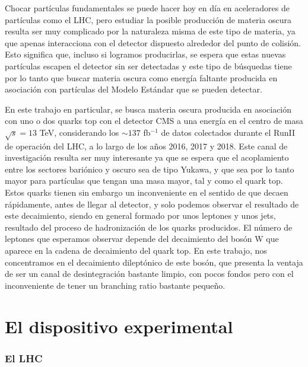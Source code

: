 \documentclass[a4paper, 10pt, openright]{report}
\begin{document}
\begin{appendices}
Chocar part\'{i}culas fundamentales se puede hacer hoy en d\'{i}a en aceleradores de part\'{i}culas como el \ac{LHC}, pero estudiar la posible producci\'{o}n de materia oscura resulta ser muy complicado por la naturaleza misma de este tipo de materia, ya que apenas interacciona con el detector dispuesto alrededor del punto de colisi\'{o}n. Esto significa que, incluso si logramos producirlas, se espera que estas nuevas part\'{i}culas escapen el detector sin ser detectadas y este tipo de b\'{u}squedas tiene por lo tanto que buscar materia oscura como energ\'{i}a faltante producida en asociaci\'{o}n con part\'{i}culas del Modelo Est\'{a}ndar que se pueden detectar. 

En este trabajo en particular, se busca materia oscura producida en asociaci\'{o}n con uno o dos quarks top con el detector \ac{CMS} a una energ\'{i}a en el centro de masa $\sqrt{s} = 13$ TeV, considerando los $\sim 137$ fb$^{-1}$ de datos colectados durante el RunII de operaci\'{o}n del \ac{LHC}, a lo largo de los a\~{n}os 2016, 2017 y 2018. Este canal de investigaci\'{o}n resulta ser muy interesante ya que se espera que el acoplamiento entre los sectores bari\'{o}nico y oscuro sea de tipo Yukawa, y que sea por lo tanto mayor para part\'{i}culas que tengan una masa mayor, tal y como el quark top. Estos quarks tienen sin embargo un inconveniente en el sentido de que decaen r\'{a}pidamente, antes de llegar al detector, y solo podemos observar el resultado de este decaimiento, siendo en general formado por unos leptones y unos jets, resultado del proceso de hadronizaci\'{o}n de los quarks producidos. El n\'{u}mero de leptones que esperamos observar depende del decaimiento del bos\'{o}n W que aparece en la cadena de decaimiento del quark top. En este trabajo, nos concentramos en el decaimiento dilept\'{o}nico de este bos\'{o}n, que presenta la ventaja de ser un canal de desintegraci\'{o}n bastante limpio, con pocos fondos pero con el inconveniente de tener un branching ratio bastante peque\~{n}o.

\section{El dispositivo experimental}

\subsubsection{El LHC}


\end{appendices}
\end{document}
